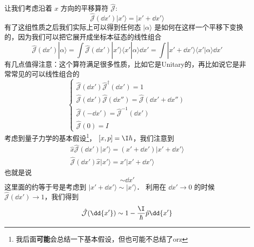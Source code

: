 让我们考虑沿着 $x$ 方向的平移算符 $\hat{\mathcal J}$: 
\begin{equation}
\hat{\mathcal{J}}(\dd{x'})|x'\rangle = |x'+\dd{x'}\rangle
\end{equation}
有了这组性质之后我们实际上可以得到任何态 $|\alpha\rangle$ 是如何在这样一个平移下变换的，因为我们可以把它展开成坐标本征态的线性组合
\begin{equation}
\hat{\mathcal{J}}(\dd{x'})|\alpha\rangle = \int\hat{\mathcal{J}}(\dd{x'})|x'\rangle\langle x'|\alpha\rangle \dd{x'} = \int|x'+\dd{x'}\rangle\langle x'|\alpha\rangle \dd{x'}
\end{equation}
有几点值得注意：这个算符满足很多性质，比如它是Unitary的，再比如说它是非常常见的可以线性组合的
\begin{equation}
\begin{cases}
\hat{\mathcal{J}}(\dd{x'})\hat{\mathcal{J}}^{\dagger}(\dd{x'}) = 1\\
\hat{\mathcal{J}}(\dd{x'})\hat{\mathcal{J}}(\dd{x''}) = \hat{\mathcal{J}}(\dd{x'} + \dd{x''})\\
\hat{\mathcal{J}}(-\dd{x'}) = \hat{\mathcal{J}}^{-1}(\dd{x'})\\
\hat{\mathcal{J}}(0) = I
\end{cases}
\end{equation}
考虑到量子力学的基本假设\footnote{我后面{\bf 可能}会总结一下基本假设，但也可能不总结了orz}， $[x,p] = \I\hbar$，我们注意到
\begin{gather}
\hat{x}\hat{\mathcal{J}}(\dd{x'})|x'\rangle = (x'+\dd{x'})|x'+\dd{x'}\rangle\\
\hat{\mathcal{J}}(\dd{x'})\hat{x}|x'\rangle = x'|x'+\dd{x'}\rangle
\end{gather}
也就是说
\begin{equation}
[\hat{x},\hat{\mathcal{J}}(\dd{x'})] \sim \dd{x'}
\end{equation}
这里面的约等于号是考虑到 $|x'+\dd{x'}\rangle \sim |x'\rangle$． 利用在 $\dd{x'}\rightarrow0$ 的时候 $\hat{\mathcal{J}}(\dd{x'})\rightarrow1$，我们得到
\begin{equation}
\hat{\mathcal{J}}(\dd{x'}) \sim 1-\frac{\I}{\hbar}\hat{p}\dd{x'}
\end{equation}

